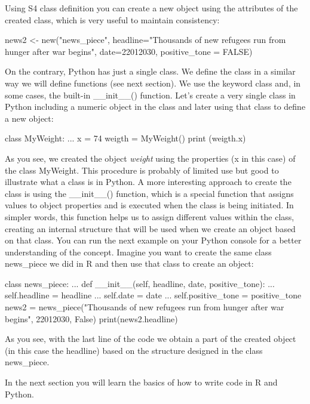 Using S4 class definition you can create a new object using the attributes of the created class, which is very useful to maintain consistency:

\begin{exampler}
news2 <- new("news_piece", headline="Thousands of new refugees run from hunger after war begins", date=22012030, positive_tone = FALSE)
\end{exampler}

On the contrary, Python has just a single class. We define the class in a similar way we will define functions (see next section). We use the keyword class and, in some cases, the built-in \_\_init\_\_() function.  Let's create a very single class in Python including a numeric object in the class and later using that class to define a new object:

\begin{examplepy}
class MyWeight:
...    	 x = 74
weigth = MyWeight()
print (weigth.x)
\end{examplepy}

As you see, we created the object \emph{weight} using the properties (x in this case) of the class MyWeight. This procedure is probably of limited use but good to illustrate what a class is in Python. A more interesting approach to create the class is using the \_\_init\_\_() function, which is a special function that assigns values to object properties and is executed when the class is being initiated. In simpler words, this function helps us to assign different values within the class, creating an internal structure that will be used when we create an object based on that class. You can run the next example on your Python console for a better understanding of the concept. Imagine you want to create the same class news\_piece we did in R and then use that class to create an object:

\begin{examplepy}
class news_piece:
...     def __init__(self, headline, date, positive_tone):
...             self.headline = headline
...             self.date = date
...             self.positive_tone = positive_tone
news2 = news_piece("Thousands of new refugees run from hunger after war begins", 22012030, False)
print(news2.headline)
\end{examplepy}

As you see, with the last line of the code we obtain a part of the created object (in this case the headline) based on the structure designed in the class news\_piece.

In the next section you will learn the basics of how to write code in R and Python.
